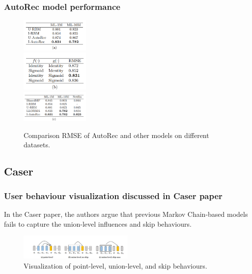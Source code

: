 \documentclass{ieeetj}
\begin{document}
\subsubsection{AutoRec model performance}
\begin{figure}[h]
	\centering
	\includegraphics[width=0.3\textwidth]{figures/autorecresults1.png}\\
	\includegraphics[width=0.3\textwidth]{figures/autorecresults2.png}\\
	\includegraphics[width=0.3\textwidth]{figures/autorecresults3.png}
	\caption{Comparison RMSE of AutoRec and other models on different datasets.}	
	\label{fig:autorec_performance}
\end{figure}

\FloatBarrier
\subsection{Caser}
\subsubsection{User behaviour visualization discussed in Caser paper}
In the Caser paper, the authors argue that previous Markov Chain-based models fails to capture the union-level influences and skip behaviours. 
\begin{figure}[h]
\centering
\includegraphics[width=0.5\textwidth]{figures/caser-behaviour.png}
\caption{Visualization of point-level, union-level, and skip behaviours.}
\label{fig:caser-behaviour}
\label{fig:caser1}
\end{figure}
\end{document}
